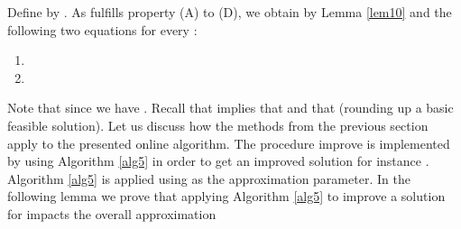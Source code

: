 \documentclass[a4paper,11pt]{article}
\begin{document}
Define  by .
As  fulfills property (A) to (D), we obtain by Lemma \ref{lem10} and  the following 
two equations for every :
\begin{enumerate}
\item 
\item 
\end{enumerate}
Note that since  we have . Recall that
 implies that 
 and that 
 (rounding up a basic feasible solution).
Let us discuss how the methods from the previous section apply to the presented online algorithm.
The procedure improve is implemented by using Algorithm \ref{alg5} in order 
to get an improved solution for instance . 
Algorithm \ref{alg5} is applied using  as the approximation parameter. 
In the following lemma we prove that
applying Algorithm \ref{alg5} to improve a solution for  impacts the overall approximation 
\end{document}
